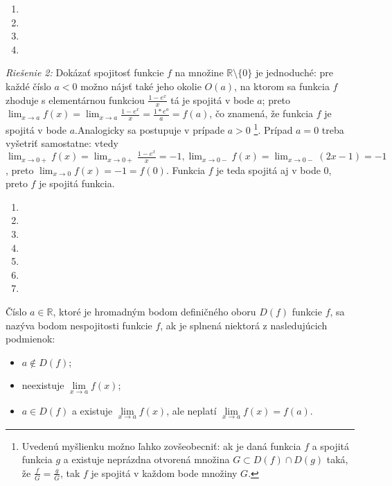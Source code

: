  \begin{enumerate}[resume]
  \item {}
  \item {}
  \item {}
  \item {}
\end{enumerate}

\textit{Riešenie 2:}
Dokázať spojitosť funkcie $f$ na množine $\mathbb{R} \setminus \{0\}$ je jednoduché: pre každé číslo $a<0$ možno nájsť také jeho okolie $O(a)$, na ktorom sa funkcia $f$ zhoduje s elementárnou funkciou $\frac{1-e^x}{x}$ tá je spojitá v bode $a$; preto $\lim_{x \rightarrow a}f(x)=\lim_{x \rightarrow a}\frac{1-e^x}{x}=\frac{1*e^a}{a}=f(a)$, čo znamená, že funkcia $f$ je spojitá v bode $a$.Analogicky sa postupuje v prípade $a>0$ \footnote{Uvedenú myšlienku možno ľahko zovšeobecniť: ak je daná funkcia $f$ a spojitá funkcia $g$ a existuje neprázdna otvorená množina $G \subset D(f) \cap D(g)$ taká, že $\frac{f}{G}=\frac{g}{G}$, tak $f$ je spojitá v každom bode množiny $G$.}. Prípad $a=0$ treba vyšetriť samostatne: vtedy $\lim_{x \rightarrow 0+}f(x)=\lim_{x \rightarrow 0+}\frac{1-e^x}{x}=-1,\lim_{x \rightarrow 0-}f(x)=\lim_{x \rightarrow 0-}(2x-1)=-1$, preto $\lim_{x \rightarrow 0}f(x)=-1=f(0)$. Funkcia $f$ je teda spojitá aj v bode $0$, preto $f$ je spojitá funkcia.

\begin{enumerate}[resume]
  \item {}
  \item {}
  \item {}
  \item {}
  \item {}
  \item {}
  \item {}
\end{enumerate}

Číslo $a \in \mathbb{R}$, ktoré je hromadným bodom definičného oboru $D(f)$ funkcie $f$, sa nazýva bodom nespojitosti funkcie $f$, ak je splnená niektorá z nasledujúcich podmienok:
\begin{itemize}
\item $a \notin D(f)$;
\item neexistuje $\lim\limits_{x \rightarrow a}f(x)$;
\item $a \in D(f)$ a existuje $\lim\limits_{x \rightarrow a}f(x)$, ale neplatí
      $\lim\limits_{x \rightarrow a}f(x)=f(a)$.
\end{itemize}

